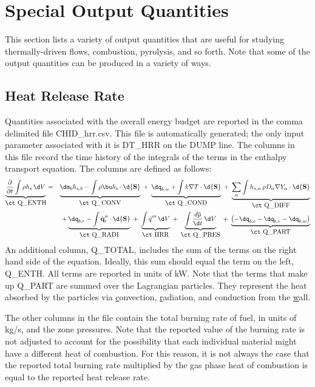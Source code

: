 \documentclass[11pt]{book}
\begin{document}
\section{Special Output Quantities}

This section lists a variety of output quantities that are useful for studying thermally-driven flows, combustion, pyrolysis, and so forth. Note that some of the output quantities can be produced in a variety of ways.


\subsection{Heat Release Rate}
\label{info:HRR}

Quantities associated with the overall energy budget are reported in
the comma delimited file {\ct CHID\_hrr.csv}.  This file is
automatically generated; the only input parameter associated with it
is {\ct DT\_HRR} on the {\ct DUMP} line. The columns in this file record the time history of the integrals of the terms in the enthalpy transport equation.
The columns are defined as follows:
\begin{eqnarray}
\label{eqn_enthalpytransport}
\underbrace{\frac{\partial}{\partial t} \int \rho h_s \, \d V }_{\hbox{\ct Q\_ENTH}} &=&
\underbrace{\dm_b h_{s,b} - \int \rho \bu h_{\rm s} \cdot \d {\bf S}}_{\hbox{\ct Q\_CONV}}
\; + \; \underbrace{\dq_{b,w} + \int k \nabla T \cdot \d {\bf S}}_{\hbox{\ct Q\_COND}}
\; + \; \underbrace{\sum_\alpha \int h_{s,\alpha} \, \rho D_\alpha \nabla Y_\alpha \cdot \d {\bf S}}_{\hbox{\ct Q\_DIFF}}  \nonumber \\
&&
+\underbrace{\dq_{b,r} - \int \dot{\mathbf{q}}^{\prime\prime}_{r} \cdot \d {\bf S}}_{\hbox{\ct Q\_RADI}}
\; + \; \underbrace{\int \dot{q}''' \, \d V}_{\hbox{\ct HRR}}
\; + \; \underbrace{\int \frac{d \overline{p} }{\d t} \, \d V}_{\hbox{\ct Q\_PRES}}
\; + \; \underbrace{\left( -\dq_{b,c} - \dq_{b,r} - \dq_{b,w} \right) }_{\hbox{\ct Q\_PART}}
\end{eqnarray}
An additional column, {\ct Q\_TOTAL}, includes the sum of the terms on the right hand side of the equation. Ideally, this sum should equal the term on the left, {\ct Q\_ENTH}. All terms
are reported in units of kW. Note that the terms that make up {\ct Q\_PART} are summed over the Lagrangian particles. They represent the heat absorbed by the particles via \underline{c}onvection, \underline{r}adiation, and conduction from the \underline{w}all.

The other columns in the file contain the total burning rate of
fuel, in units of kg/s, and the zone pressures. Note that the reported value of the burning rate is not adjusted to account for the possibility that each individual
material might have a different heat of combustion. For this reason, it is not always the case that the reported total
burning rate multiplied by the gas phase heat of combustion is equal to the reported heat release rate.
\end{document}
